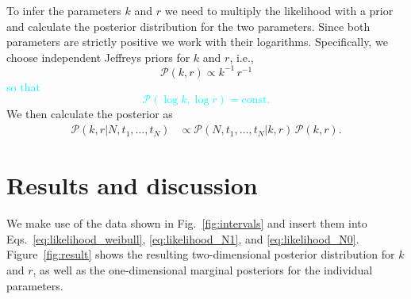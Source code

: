 \documentclass[fleqn,usenatbib]{mnras}
\newcommand{\new}[1]{\textcolor{cyan}{#1}}
\begin{document}
To infer the parameters $k$ and $r$ we need to multiply the likelihood with a prior and calculate the posterior distribution for the two parameters. Since both parameters are strictly positive we work with their logarithms. Specifically, we choose independent Jeffreys priors for $k$ and $r$, i.e.,
\begin{equation}
	\mathcal{P}(k,r) \propto k^{-1} \, r^{-1}
\end{equation}
\new{so that
\begin{equation}
	\mathcal{P}(\log k,\log r) = \mathrm{const}.
\end{equation}}
We then calculate the posterior as
\begin{align}
	\mathcal{P}(k,r|N,t_1,\dots,t_N) &\propto \mathcal{P}(N,t_1,\dots,t_N|k,r)\,\mathcal{P}(k,r).
\end{align}


\section{Results and discussion}
\label{sec:results}

We make use of the data shown in Fig.~\ref{fig:intervals} and insert them into Eqs.~\eqref{eq:likelihood_weibull}, \eqref{eq:likelihood_N1}, and \eqref{eq:likelihood_N0}. Figure~\ref{fig:result} shows the resulting two-dimensional posterior distribution for $k$ and $r$, as well as the one-dimensional marginal posteriors for the individual parameters.
\end{document}

